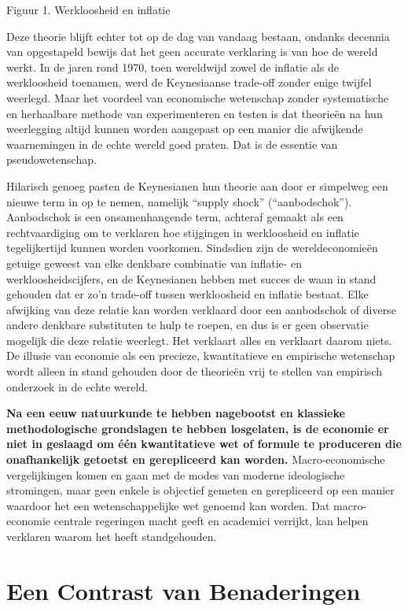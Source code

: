Figuur 1. Werkloosheid en inflatie\autocite{11}

Deze theorie blijft echter tot op de dag van vandaag bestaan, ondanks decennia van opgestapeld bewijs dat het geen accurate verklaring is van hoe de wereld werkt. In de jaren rond 1970, toen wereldwijd zowel de inflatie als de werkloosheid toenamen, werd de Keynesiaanse trade-off zonder enige twijfel weerlegd. Maar het voordeel van economische wetenschap zonder systematische en herhaalbare methode van experimenteren en testen is dat theorieën na hun weerlegging altijd kunnen worden aangepast op een manier die afwijkende waarnemingen in de echte wereld goed praten. Dat is de essentie van pseudowetenschap.

Hilarisch genoeg pasten de Keynesianen hun theorie aan door er simpelweg een nieuwe term in op te nemen, namelijk “supply shock” (“aanbodschok”). Aanbodschok is een onsamenhangende term, achteraf gemaakt als een rechtvaardiging om te verklaren hoe stijgingen in werkloosheid en inflatie tegelijkertijd kunnen worden voorkomen. Sindsdien zijn de wereldeconomieën getuige geweest van elke denkbare combinatie van inflatie- en werkloosheidscijfers, en de Keynesianen hebben met succes de waan in stand gehouden dat er zo’n trade-off tussen werkloosheid en inflatie bestaat. Elke afwijking van deze relatie kan worden verklaard door een aanbodschok of diverse andere denkbare substituten te hulp te roepen, en dus is er geen observatie mogelijk die deze relatie weerlegt. Het verklaart alles en verklaart daarom niets. De illusie van economie als een precieze, kwantitatieve en empirische wetenschap wordt alleen in stand gehouden door de theorieën vrij te stellen van empirisch onderzoek in de echte wereld.

\textbf{Na een eeuw natuurkunde te hebben nagebootst en klassieke methodologische grondslagen te hebben losgelaten, is de economie er niet in geslaagd om één kwantitatieve wet of formule te produceren die onafhankelijk getoetst en gerepliceerd kan worden.} Macro-economische vergelijkingen komen en gaan met de modes van moderne ideologische stromingen, maar geen enkele is objectief gemeten en gerepliceerd op een manier waardoor het een wetenschappelijke wet genoemd kan worden. Dat macro-economie centrale regeringen macht geeft en academici verrijkt, kan helpen verklaren waarom het heeft standgehouden.

\section{Een Contrast van Benaderingen}

